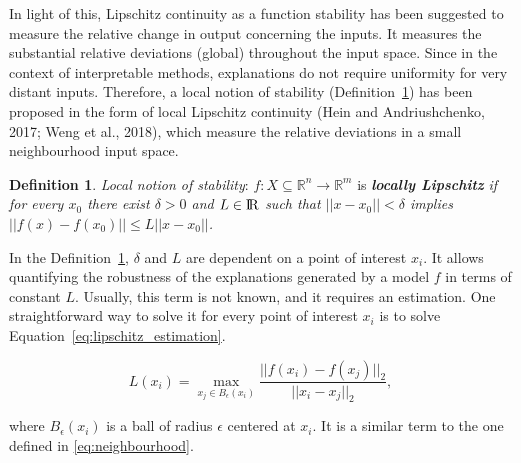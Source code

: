 \documentclass[english]{tktltiki2}
\theoremstyle{definition}
\newtheorem{definition}[thm]{Definition}
\theoremstyle{remark}
\begin{document}
In light of this, Lipschitz continuity as a function stability has been suggested to measure the relative change in output concerning the inputs. It measures the substantial relative deviations (global) throughout the input space. Since in the context of interpretable methods, explanations do not require uniformity for very distant inputs. Therefore, a local notion of stability (Definition~\ref{def:3}) has been proposed in the form of local Lipschitz continuity (Hein and Andriushchenko, 2017; Weng et al., 2018), which measure the relative deviations in a small neighbourhood input space.
\begin{definition}\label{def:3}{\textit{Local notion of stability}:}
	$f: X \subseteq {\mathbb{R}}^n \rightarrow {\mathbb{R}}^m$ is \textbf{\textit{locally Lipschitz}} \textit{if for every $x_0$ there exist $\delta > 0$ and $L \in {\rm I\!R}$ such that $||x - x_0|| < \delta$ implies $||f(x) - f(x_0)|| \leq L||x - x_0||$.}
\end{definition}

In the Definition~\ref{def:3}, $\delta$ and $L$ are dependent on a point of interest $x_i$. It allows quantifying the robustness of the explanations generated by a model $f$ in terms of constant $L$. Usually, this term is not known, and it requires an estimation. One straightforward way to solve it for every point of interest $x_i$ is to solve Equation~\eqref{eq:lipschitz_estimation}.


\begin{equation}\label{eq:lipschitz_estimation}
L(x_i) = \operatorname*{max}_{x_j \in B_{\epsilon}(x_i)}  \frac{||f(x_i) - f(x_j)||_{2}}{||x_i - x_j||_{2}},
\end{equation}

where $B_{\epsilon}(x_{i})$ is a ball of radius $\epsilon$ centered at $x_i$. It is a similar term to the one defined in \eqref{eq:neighbourhood}. 
\end{document}
